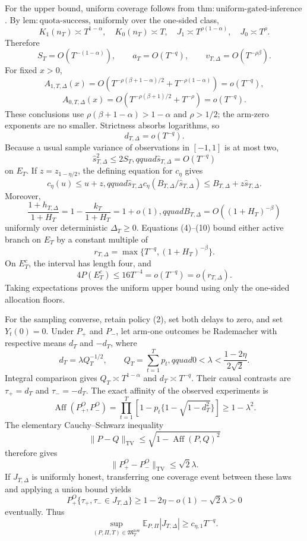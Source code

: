 For the upper bound, uniform coverage follows from \(\mathrm{thm:uniform\text{-}gated\text{-}inference}\).  By \(\mathrm{lem:quota\text{-}success}\), uniformly over the one-sided class,
\[
 K_1(n_T)\asymp T^{1-\alpha},\quad K_0(n_T)\asymp T,
 \quad J_1\asymp T^{\rho(1-\alpha)},\quad J_0\asymp T^\rho. \tag{3}
\]
Therefore
\[
 S_T=O(T^{-(1-\alpha)}),\qquad a_T=O(T^{-q}),\qquad
 v_{T,\Delta}=O(T^{-\rho\beta}). \tag{4}
\]
For fixed \(x>0\),
\[
 A_{1,T,\Delta}(x)=O\!\left(T^{-\rho(\beta+1-\alpha)/2}
 +T^{-\rho(1-\alpha)}\right)=o(T^{-q}), \tag{5}
\]
\[
 A_{0,T,\Delta}(x)=O\!\left(T^{-\rho(\beta+1)/2}+T^{-\rho}\right)
 =o(T^{-q}). \tag{6}
\]
These conclusions use \(\rho(\beta+1-\alpha)>1-\alpha\) and \(\rho>1/2\); the arm-zero exponents are no smaller.  Strictness absorbs logarithms, so
\[
 d_{T,\Delta}=o(T^{-q}). \tag{7}
\]
Because a usual sample variance of observations in \([-1,1]\) is at most two,
\[
 \widehat s_{T,\Delta}^2\leq2S_T,qquad
 \widehat s_{T,\Delta}=O(T^{-q}) \tag{8}
\]
on \(E_T\).  If \(z=z_{1-\eta/2}\), the defining equation for \(c_\eta\) gives
\[
 c_\eta(u)\leq u+z,qquad
 \widehat s_{T,\Delta}c_\eta(B_{T,\Delta}/\widehat s_{T,\Delta})
 \leq B_{T,\Delta}+z\widehat s_{T,\Delta}. \tag{9}
\]
Moreover,
\[
 \frac{1+h_{T,\Delta}}{1+H_T}
 =1-\frac{k_T}{1+H_T}=1+o(1),qquad
 B_{T,\Delta}=O((1+H_T)^{-\beta}) \tag{10}
\]
uniformly over deterministic \(\Delta_T\geq0\).  Equations (4)--(10) bound either active branch on \(E_T\) by a constant multiple of
\[
 r_{T,\Delta}=\max\{T^{-q},(1+H_T)^{-\beta}\}. \tag{11}
\]
On \(E_T^c\), the interval has length four, and
\[
 4P(E_T^c)\leq16T^{-4}=o(T^{-q})=o(r_{T,\Delta}). \tag{12}
\]
Taking expectations proves the uniform upper bound using only the one-sided allocation floors.

For the sampling converse, retain policy (2), set both delays to zero, and set \(Y_t(0)=0\).  Under \(P_+\) and \(P_-\), let arm-one outcomes be Rademacher with respective means \(d_T\) and \(-d_T\), where
\[
 d_T=\lambda Q_T^{-1/2},\qquad Q_T=\sum_{t=1}^Tp_t,qquad
 0<\lambda<\frac{1-2\eta}{2\sqrt2}. \tag{13}
\]
Integral comparison gives \(Q_T\asymp T^{1-\alpha}\) and \(d_T\asymp T^{-q}\).  Their causal contrasts are \(\tau_+=d_T\) and \(\tau_-=-d_T\).  The exact affinity of the observed experiments is
\[
 \operatorname{Aff}(P_+^O,P_-^O)
 =\prod_{t=1}^T[1-p_t\{1-\sqrt{1-d_T^2}\}]
 \geq1-\lambda^2. \tag{14}
\]
The elementary Cauchy--Schwarz inequality
\[
 \|P-Q\|_{\mathrm{TV}}\leq\sqrt{1-\operatorname{Aff}(P,Q)^2}
\]
therefore gives
\[
 \|P_+^O-P_-^O\|_{\mathrm{TV}}\leq\sqrt2\lambda. \tag{15}
\]
If \(J_{T,\Delta}\) is uniformly honest, transferring one coverage event between these laws and applying a union bound yields
\[
 P_+^O\{\tau_+,\tau_-\in J_{T,\Delta}\}
 \geq1-2\eta-o(1)-\sqrt2\lambda>0 \tag{16}
\]
eventually.  Thus
\[
 \sup_{(P,\Pi,T)\in\mathfrak M_T^{\mathrm{low}}}
 \mathbb E_{P,\Pi}|J_{T,\Delta}|\geq c_{\eta,1}T^{-q}. \tag{17}
\]

